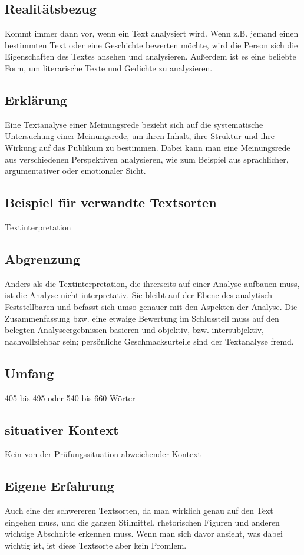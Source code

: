 \subsection{Realitätsbezug}
Kommt immer dann vor, wenn ein Text analysiert wird. Wenn z.B. jemand einen bestimmten Text oder eine Geschichte bewerten möchte, wird die Person sich die Eigenschaften des Textes ansehen und analysieren. Außerdem ist es eine beliebte Form, um literarische Texte und Gedichte zu analysieren.
\subsection{Erklärung}

Eine Textanalyse einer Meinungsrede bezieht sich auf die systematische Untersuchung einer Meinungsrede, um ihren Inhalt, ihre Struktur und ihre Wirkung auf das Publikum zu bestimmen. Dabei kann man eine Meinungsrede aus verschiedenen Perspektiven analysieren, wie zum Beispiel aus sprachlicher, argumentativer oder emotionaler Sicht.


\subsection{Beispiel für verwandte Textsorten} Textinterpretation
\subsection{Abgrenzung} Anders als die Textinterpretation, die ihrerseits auf einer Analyse aufbauen muss, ist die Analyse nicht interpretativ. Sie bleibt auf der Ebene
des analytisch Feststellbaren und befasst sich umso genauer mit den
Aspekten der Analyse. Die Zusammenfassung bzw. eine etwaige
Bewertung im Schlussteil muss auf den belegten Analyseergebnissen
basieren und objektiv, bzw. intersubjektiv, nachvollziehbar sein;
persönliche Geschmacksurteile sind der Textanalyse fremd. 

\subsection{Umfang}405 bis 495 oder 540 bis 660 Wörter

\subsection{situativer Kontext} Kein von der Prüfungssituation abweichender Kontext 
\subsection{Eigene Erfahrung} Auch eine der schwereren Textsorten, da man wirklich genau auf den Text eingehen muss, und die ganzen Stilmittel, rhetorischen Figuren und anderen wichtige Abschnitte erkennen muss. Wenn man sich davor ansieht, was dabei wichtig ist, ist diese Textsorte aber kein Promlem.